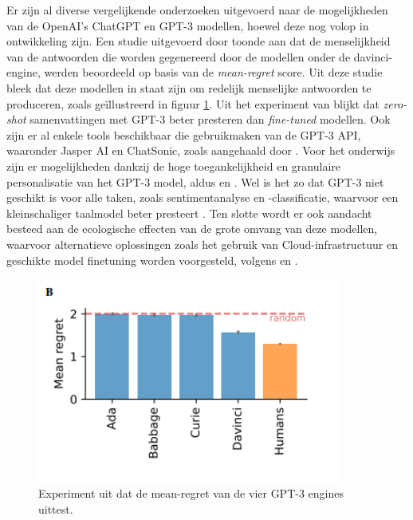 Er zijn al diverse vergelijkende onderzoeken uitgevoerd naar de mogelijkheden van de OpenAI's ChatGPT en GPT-3 modellen, hoewel deze nog volop in ontwikkeling zijn. Een studie uitgevoerd door \textcite{Binz2023} toonde aan dat de menselijkheid van de antwoorden die worden gegenereerd door de modellen onder de davinci-engine, werden beoordeeld op basis van de \textit{mean-regret} score. Uit deze studie bleek dat deze modellen in staat zijn om redelijk menselijke antwoorden te produceren, zoals geïllustreerd in figuur \ref{img:mean-regret-chatgpt}. Uit het experiment van \textcite{Goyal2022} blijkt dat \textit{zero-shot} samenvattingen met GPT-3 beter presteren dan \textit{fine-tuned} modellen. Ook zijn er al enkele tools beschikbaar die gebruikmaken van de GPT-3 API, waaronder Jasper AI en ChatSonic, zoals aangehaald door \textcite{Mottesi2023}. Voor het onderwijs zijn er mogelijkheden dankzij de hoge toegankelijkheid en granulaire personalisatie van het GPT-3 model, aldus \textcite{Roose2023} en \textcite{Garg2022}. Wel is het zo dat GPT-3 niet geschikt is voor alle taken, zoals sentimentanalyse en -classificatie, waarvoor een kleinschaliger taalmodel beter presteert \autocite{Li2022}. Ten slotte wordt er ook aandacht besteed aan de ecologische effecten van de grote omvang van deze modellen, waarvoor alternatieve oplossingen zoals het gebruik van Cloud-infrastructuur en geschikte model finetuning worden voorgesteld, volgens \textcite{Strubell2019} en \textcite{Simon2021}.

\medspace

\begin{figure}[H]
	\begin{center}
		\includegraphics[width=10cm]{img/chatgpt-engines-mean-regret.png}
		\caption{Experiment uit \textcite{Binz2023} dat de mean-regret van de vier GPT-3 engines uittest.}
		\label{img:mean-regret-chatgpt}
	\end{center}
\end{figure}

